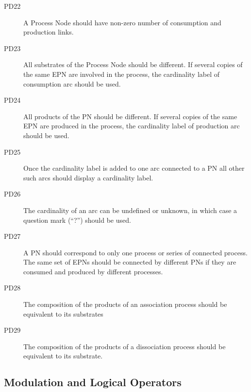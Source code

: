 \begin{description}
\item[PD22] A Process Node should have non-zero number of consumption and production links.
\item[PD23] All substrates of the Process Node should be different. If several copies of the same EPN are involved in the process, the cardinality label of consumption arc should be used.
\item[PD24] All products of the PN should be different. If several copies of the same EPN are produced in the process, the cardinality label of production arc should be used.
\item[PD25] Once the cardinality label is added to one arc connected to a PN all other such arcs should display a cardinality label.
\item[PD26] The cardinality of an arc can be undefined or unknown, in which case a question mark (``?'') should be used.
\item[PD27] A PN should correspond to only one process or series of connected process. The same set of EPNs should be connected by different PNs if they are consumed and produced by different processes.
\item[PD28] The composition of the products of an association process should be equivalent to its substrates
\item[PD29] The composition of the products of a dissociation process should be equivalent to its substrate.
\end{description}

\subsection{Modulation and Logical Operators}

